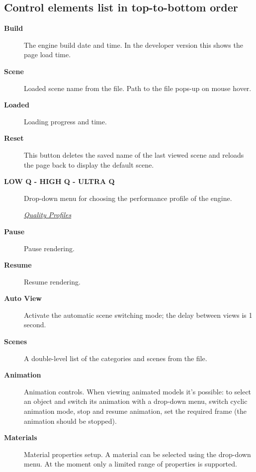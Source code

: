 \documentclass[a4paper,12pt,oneside]{sphinxmanual}
\begin{document}
\subsection{Control elements list in top-to-bottom order}
\label{viewer:id4}\begin{description}
\item[{\textbf{Build}}] \leavevmode
The engine build date and time. In the developer version this shows the page load time.

\item[{\textbf{Scene}}] \leavevmode
Loaded scene name from the  file. Path to the file pops-up on mouse hover.

\item[{\textbf{Loaded}}] \leavevmode
Loading progress and time.

\item[{\textbf{Reset}}] \leavevmode
This button deletes the saved name of the last viewed scene and reloads the page back to display the default scene.

\item[{\textbf{LOW Q - HIGH Q - ULTRA Q}}] \leavevmode
Drop-down menu for choosing the performance profile of the engine.




{\hyperref[developers:quality-settings]{\emph{Quality Profiles}}}



\item[{\textbf{Pause}}] \leavevmode
Pause rendering.

\item[{\textbf{Resume}}] \leavevmode
Resume rendering.

\item[{\textbf{Auto View}}] \leavevmode
Activate the automatic scene switching mode; the delay between views is 1 second.

\item[{\textbf{Scenes}}] \leavevmode
A double-level list of the categories and scenes from the  file.

\item[{\textbf{Animation}}] \leavevmode
Animation controls. When viewing animated models it's possible: to select an object and switch its animation with a drop-down menu, switch cyclic animation mode, stop and resume animation, set the required frame (the animation should be stopped).

\item[{\textbf{Materials}}] \leavevmode
Material properties setup. A material can be selected using the drop-down menu. At the moment only a limited range of properties is supported.


\end{description}
\end{document}
